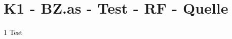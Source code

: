 \section{K1 - BZ.as - Test - RF - Quelle}

\begin{langesbeispiel} \item[1] %
Test
\end{langesbeispiel}